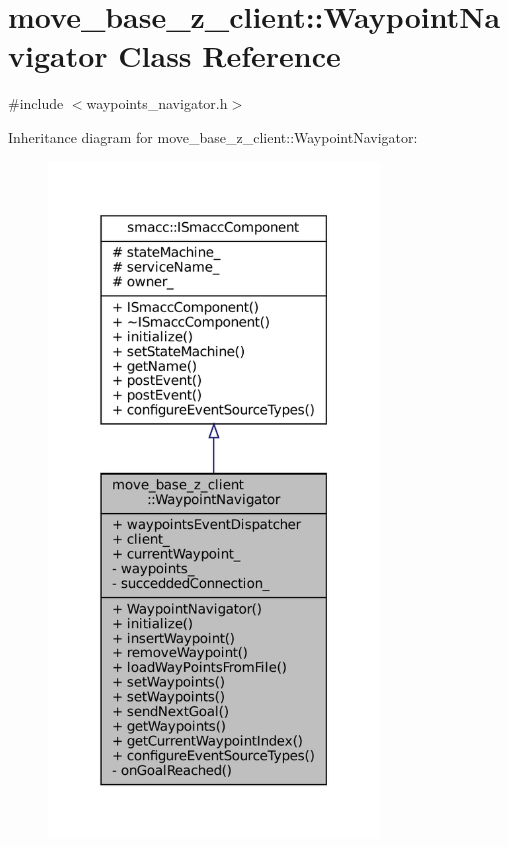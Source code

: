\hypertarget{classmove__base__z__client_1_1WaypointNavigator}{}\section{move\+\_\+base\+\_\+z\+\_\+client\+:\+:Waypoint\+Navigator Class Reference}
\label{classmove__base__z__client_1_1WaypointNavigator}


{\ttfamily \#include $<$waypoints\+\_\+navigator.\+h$>$}



Inheritance diagram for move\+\_\+base\+\_\+z\+\_\+client\+:\+:Waypoint\+Navigator\+:
\nopagebreak
\begin{figure}[H]
\begin{center}
\leavevmode
\includegraphics[width=249pt]{classmove__base__z__client_1_1WaypointNavigator__inherit__graph}
\end{center}
\end{figure}


